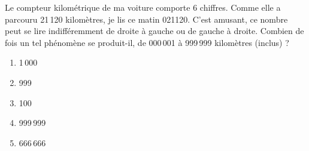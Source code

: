 Le compteur kilométrique de ma voiture comporte 6 chiffres. Comme elle
a parcouru 21\,120 kilomètres, je lis ce matin 021120. \og C'est
amusant, ce nombre peut se lire indifféremment de droite à gauche ou
de gauche à droite\fg. Combien de fois un tel phénomène se produit-il,
de 000\,001 à 999\,999 kilomètres (inclus) ?
\begin{multicols}{5}
  \begin{enumerate}[A/]
  \item 1\,000
  \item 999
  \item 100
  \item 999\,999
  \item 666\,666
  \end{enumerate}
\end{multicols}